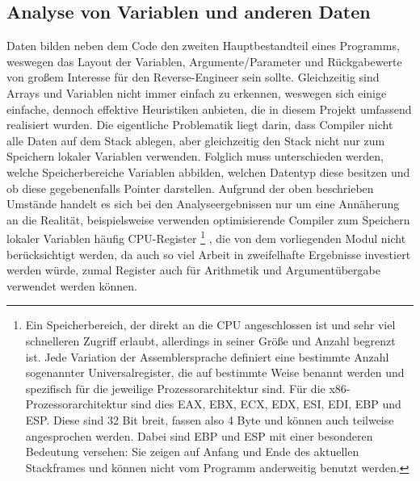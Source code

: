 \documentclass[11pt]{article}
\begin{document}
\subsection{Analyse von Variablen und anderen Daten} Daten bilden neben dem Code den zweiten
Hauptbestandteil eines Programms, weswegen das Layout der Variablen, Argumente/Parameter und
Rückgabewerte von großem Interesse für den Reverse-Engineer sein sollte. Gleichzeitig sind Arrays
und Variablen nicht immer einfach zu erkennen, weswegen sich einige einfache, dennoch effektive
Heuristiken anbieten, die in diesem Projekt umfassend realisiert wurden. Die eigentliche Problematik
liegt darin, dass Compiler nicht alle Daten auf dem Stack ablegen, aber gleichzeitig den Stack nicht
nur zum Speichern lokaler Variablen verwenden. Folglich muss unterschieden werden, welche
Speicherbereiche Variablen abbilden, welchen Datentyp diese besitzen und ob diese gegebenenfalls
Pointer darstellen. Aufgrund der oben beschrieben Umstände handelt es sich bei den
Analyseergebnissen nur um eine Annäherung an die Realität, beispielsweise verwenden optimisierende
Compiler zum Speichern lokaler Variablen häufig CPU-Register
\footnote{Ein Speicherbereich, der direkt an die CPU angeschlossen ist und sehr viel schnelleren
Zugriff erlaubt, allerdings in seiner Größe und Anzahl begrenzt ist. Jede Variation der
Assemblersprache definiert eine bestimmte Anzahl sogenannter Universalregister, die auf bestimmte
Weise benannt werden und spezifisch für die jeweilige Prozessorarchitektur sind. Für die
x86-Prozessorarchitektur sind dies EAX, EBX, ECX, EDX, ESI, EDI, EBP und ESP. Diese sind 32 Bit
breit, fassen also 4 Byte und können auch teilweise angesprochen werden. Dabei sind EBP und ESP mit
einer besonderen Bedeutung versehen: Sie zeigen auf Anfang und Ende des aktuellen Stackframes und
können nicht vom Programm anderweitig benutzt werden.}
, die von dem vorliegenden
Modul nicht berücksichtigt werden, da auch so viel Arbeit in zweifelhafte Ergebnisse investiert
werden würde, zumal Register auch für Arithmetik und Argumentübergabe verwendet werden können.
\end{document}
